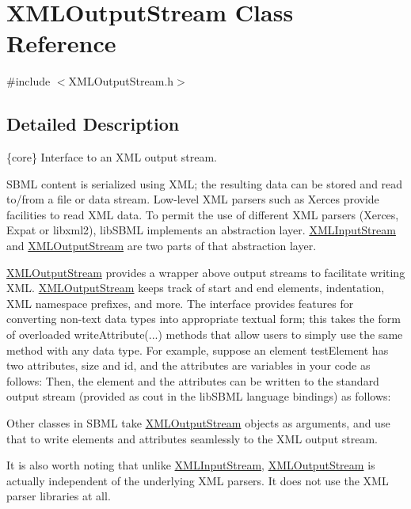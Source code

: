 \hypertarget{class_x_m_l_output_stream}{}\section{X\+M\+L\+Output\+Stream Class Reference}
\label{class_x_m_l_output_stream}


{\ttfamily \#include $<$X\+M\+L\+Output\+Stream.\+h$>$}



\subsection{Detailed Description}
\{core\} Interface to an X\+ML output stream.



S\+B\+ML content is serialized using X\+ML; the resulting data can be stored and read to/from a file or data stream. Low-\/level X\+ML parsers such as Xerces provide facilities to read X\+ML data. To permit the use of different X\+ML parsers (Xerces, Expat or libxml2), lib\+S\+B\+ML implements an abstraction layer. \hyperlink{class_x_m_l_input_stream}{X\+M\+L\+Input\+Stream} and \hyperlink{class_x_m_l_output_stream}{X\+M\+L\+Output\+Stream} are two parts of that abstraction layer.

\hyperlink{class_x_m_l_output_stream}{X\+M\+L\+Output\+Stream} provides a wrapper above output streams to facilitate writing X\+ML. \hyperlink{class_x_m_l_output_stream}{X\+M\+L\+Output\+Stream} keeps track of start and end elements, indentation, X\+ML namespace prefixes, and more. The interface provides features for converting non-\/text data types into appropriate textual form; this takes the form of overloaded {\ttfamily write\+Attribute(...)} methods that allow users to simply use the same method with any data type. For example, suppose an element {\ttfamily test\+Element} has two attributes, {\ttfamily size} and {\ttfamily id}, and the attributes are variables in your code as follows\+: Then, the element and the attributes can be written to the standard output stream (provided as {\ttfamily cout} in the lib\+S\+B\+ML language bindings) as follows\+:

Other classes in S\+B\+ML take \hyperlink{class_x_m_l_output_stream}{X\+M\+L\+Output\+Stream} objects as arguments, and use that to write elements and attributes seamlessly to the X\+ML output stream.

It is also worth noting that unlike \hyperlink{class_x_m_l_input_stream}{X\+M\+L\+Input\+Stream}, \hyperlink{class_x_m_l_output_stream}{X\+M\+L\+Output\+Stream} is actually independent of the underlying X\+ML parsers. It does not use the X\+ML parser libraries at all.

